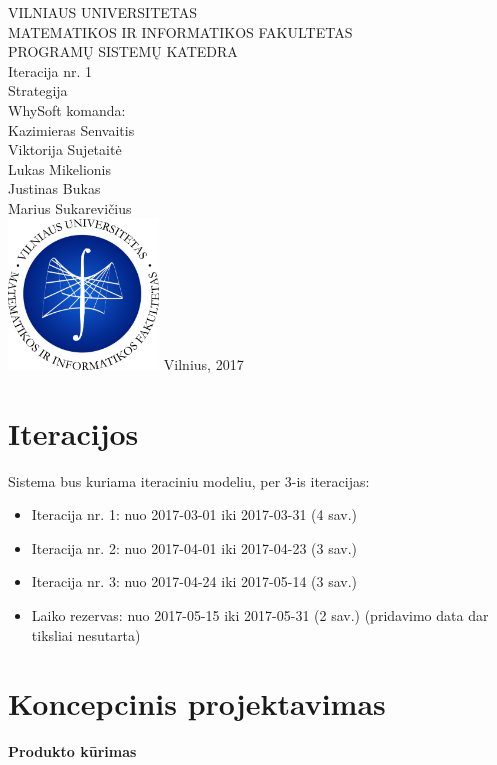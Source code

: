\documentclass[11pt]{article}
\begin{document}
\begin{titlepage}
    \centering
    \vfill
    {\Large%
    	VILNIAUS UNIVERSITETAS\\
    	MATEMATIKOS IR INFORMATIKOS FAKULTETAS\\
    	PROGRAMŲ SISTEMŲ KATEDRA\\
		\vskip2cm
        {\Huge Iteracija nr. 1\\
        Strategija\\}
        \vskip2cm
        WhySoft komanda:\\
        Kazimieras Senvaitis\\
        Viktorija Sujetaitė\\
        Lukas Mikelionis\\
        Justinas Bukas\\
        Marius Sukarevičius\\
    }    
    \vskip2cm
    \includegraphics[width=4cm]{logo.jpg} %
    \vfill
    Vilnius, 2017
    \vfill
\end{titlepage}

\section{Iteracijos}
Sistema bus kuriama iteraciniu modeliu, per 3-is iteracijas:\\
\begin{itemize}
	\item Iteracija nr. 1: nuo 2017-03-01 iki 2017-03-31 (4 sav.)
	\item Iteracija nr. 2: nuo 2017-04-01 iki 2017-04-23 (3 sav.)
	\item Iteracija nr. 3: nuo 2017-04-24 iki 2017-05-14 (3 sav.)
	\item Laiko rezervas: nuo 2017-05-15 iki 2017-05-31 (2 sav.) (pridavimo data dar tiksliai nesutarta)
\end{itemize}

\section{Koncepcinis projektavimas}
\textbf{Produkto kūrimas}
\end{document}
